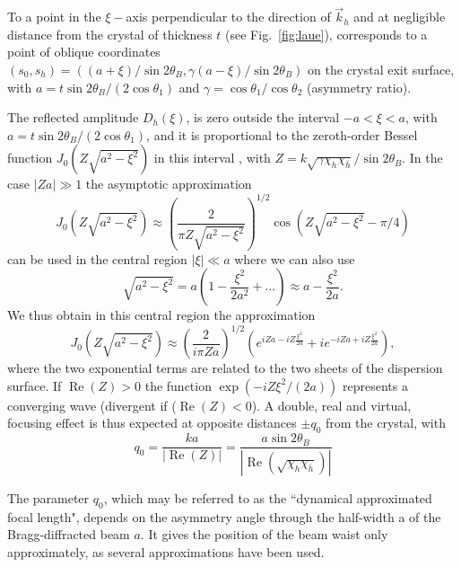 \documentclass[preprint]{iucr}              %
\begin{document}
To a point in the $\xi-$axis perpendicular to the direction of $\vec k_h$ and at negligible distance from the crystal of thickness $t$ (see Fig.~\ref{fig:laue}), corresponds to a point of oblique coordinates  $(s_0,s_h)=((a+\xi)/\sin2\theta_B,\gamma(a-\xi)/\sin2\theta_B)$ on the crystal exit surface, with $a=t \sin2\theta_B/(2\cos\theta_1)$ and $\gamma=\cos\theta_1/\cos\theta_2$ (asymmetry ratio). 

The reflected amplitude $D_h(\xi)$, is zero outside the interval $-a<\xi<a$, with $a=t \sin2\theta_B/(2 \cos\theta_1)$, and it is proportional to the zeroth-order Bessel function  $J_0(Z\sqrt{a^2-\xi^2})$ in this interval \cite{kato1961}, with  $Z=k\sqrt{\gamma\chi_h\chi_{\bar h}}/\sin2\theta_B$. In the case $|Z a| \gg 1$ the asymptotic approximation
\begin{equation}
    J_0(Z\sqrt{a^2-\xi^2})\approx \left(\frac{2}{\pi Z \sqrt{a^2-\xi^2}}\right)^{1/2} \cos(Z\sqrt{a^2-\xi^2}-\pi/4)
\end{equation}
can be used in the central region $|\xi|\ll a$ where we can also use
\begin{equation}
     \sqrt{a^2-\xi^2} = a (1-\frac{\xi^2}{2a^2}+...)\approx a - \frac{\xi^2}{2a}.
\end{equation}
We thus obtain in this central region the approximation
\begin{equation}
\label{eq:approximatedDiffractedField}
    J_0(Z\sqrt{a^2-\xi^2})\approx \left(\frac{2}{i \pi Z a}\right)^{1/2} \left( e^{iZa-i Z\frac{ \xi^2}{2a}} + i 
    e^{-i Z a+i Z\frac{\xi^2}{2a}} \right),
\end{equation}
where the two exponential terms are related to the two sheets of the dispersion surface. 
If $\operatorname{Re}(Z)>0$ the function $\exp(- i Z \xi^2 / (2 a))$ 
represents a converging wave (divergent if  ($\operatorname{Re}(Z)<0$). A double, real and virtual, focusing effect is thus expected at opposite distances $\pm q_0$ from the crystal, with
\begin{equation}
\label{eq:q0}
    q_0 = \frac{k a}{|\operatorname{Re}(Z)|}= \frac{a \sin2\theta_B}{|\operatorname{Re}(\sqrt{\chi_h\chi_{\bar h}})|}
\end{equation}

The parameter $q_0$, which may be referred to as the ``dynamical approximated focal length", depends on the asymmetry angle through the half-width a of the Bragg-diffracted beam $a$. It gives the position of the beam waist only approximately, as several approximations have been used.
\end{document}
